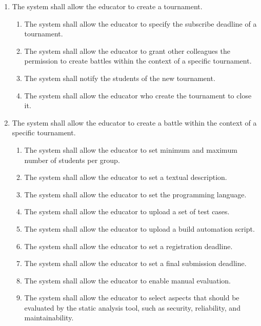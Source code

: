 \begin{enumerate}[label=\textbf{R\arabic*}:,leftmargin=1.3cm]
      \item The system shall allow the educator to create a tournament.
            \begin{enumerate}[label=\textbf{R\arabic{enumi}.\arabic*}:, leftmargin=*]
                  \item The system shall allow the educator to specify the subscribe deadline of a tournament.
                  \item The system shall allow the educator to grant other colleagues the permission to create battles within the context of a specific tournament.
                  \item The system shall notify the students of the new tournament.
                  \item The system shall allow the educator who create the tournament to close it.
            \end{enumerate}
      \item The system shall allow the educator to create a battle within the context of a specific tournament.
            \begin{enumerate}[label=\textbf{R\arabic{enumi}.\arabic*}:, leftmargin=*]
                  \item The system shall allow the educator to set minimum and maximum number of students per group.
                  \item The system shall allow the educator to set a textual description.
                  \item The system shall allow the educator to set the programming language.
                  \item The system shall allow the educator to upload a set of test cases.
                  \item The system shall allow the educator to upload a build automation script.
                  \item The system shall allow the educator to set a registration deadline.
                  \item The system shall allow the educator to set a final submission deadline.
                  \item The system shall allow the educator to enable manual evaluation.
                  \item The system shall allow the educator to select aspects that should be evaluated by the static analysis tool, such as security, reliability, and maintainability.

\end{enumerate}
\end{enumerate}

